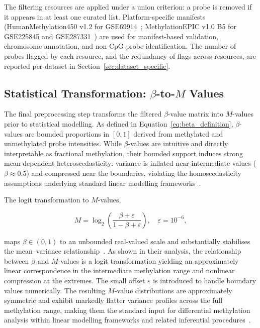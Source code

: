 The filtering resources are applied under a union criterion: a probe is removed if it appears in at least one curated list. Platform-specific 
manifests (HumanMethylation450 v1.2 for GSE69914~\cite{Illumina450kAnno}; 
MethylationEPIC v1.0 B5 for GSE225845 and GSE287331~\cite{IlluminaEPIC}) 
are used for manifest-based validation, chromosome annotation, and 
non-CpG probe identification. The number of probes flagged by each 
resource, and the redundancy of flags across resources, are reported 
per-dataset in Section~\ref{sec:dataset_specific}.

\subsection{Statistical Transformation: $\beta$-to-$M$ Values}
\label{subsec:step3}

The final preprocessing step transforms the filtered $\beta$-value matrix 
into $M$-values prior to statistical modelling. As defined in Equation~\eqref{eq:beta_definition}, $\beta$-values are bounded proportions in $[0,1]$ derived from methylated and unmethylated probe intensities. While $\beta$-values are intuitive and directly 
interpretable as fractional methylation, their bounded support induces 
strong mean-dependent heteroscedasticity: variance is inflated near 
intermediate values ($\beta \approx 0.5$) and compressed near the 
boundaries, violating the homoscedasticity assumptions underlying 
standard linear modelling frameworks~\cite{Du2010}.

The logit transformation to $M$-values,

\begin{equation}
    M = \log_2\!\left(\frac{\beta + \varepsilon}{1 - \beta + \varepsilon}\right),
    \quad \varepsilon = 10^{-6},
    \label{eq:mvalue}
\end{equation}

maps $\beta \in (0,1)$ to an unbounded real-valued scale and 
substantially stabilises the mean--variance relationship~\cite{Du2010}. 
As shown in their analysis, the relationship between $\beta$ and $M$-values 
is a logit transformation yielding an approximately linear correspondence 
in the intermediate methylation range and nonlinear compression at the 
extremes. The small offset $\varepsilon$ is introduced to handle boundary values 
numerically. The resulting $M$-value distributions are approximately 
symmetric and exhibit markedly flatter variance profiles across the full 
methylation range, making them the standard input for differential methylation analysis within linear modelling frameworks and related inferential procedures~\cite{Triche2013, Fortin2017, Thienpont2016}.

